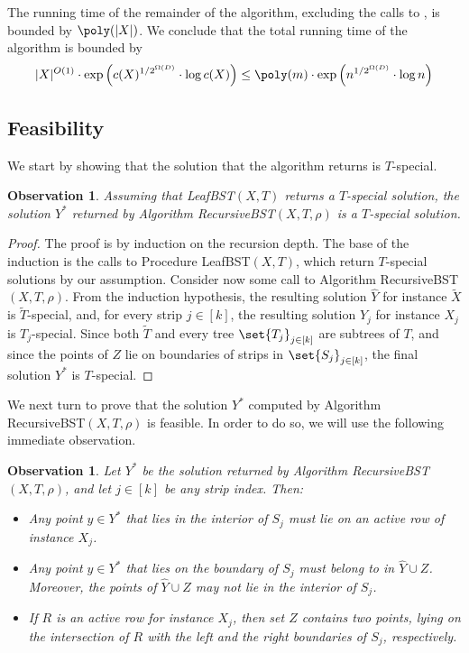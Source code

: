 \documentclass{toc}
\newtheorem{myobs}[theorem]{Observation}
\begin{document}
The running time of the remainder of the algorithm, excluding the calls to \leafBST, is bounded by $\poly(|X|)$. We conclude that the total running time of the algorithm is bounded by 
\[|X|^{O(1)}\cdot \exp\left({c(X)^{1/2^{\Omega(D)}}\cdot \log c(X)}\right )\leq \poly(m)\cdot \exp\left(n^{1/2^{\Omega(D)}}\cdot \log n \right )\] 


\subsection{Feasibility} 

We start by showing that the solution that the algorithm returns is $T$-special.

\begin{myobs}\label{obs: get special sol}
Assuming that {\sc LeafBST}$(X,T)$ returns a $T$-special solution, the solution $Y^*$ returned by Algorithm {\sc RecursiveBST}$(X,T,\rho)$ is  a $T$-special solution. 
\end{myobs}

\begin{proof}
    The proof is by induction on the recursion depth. The base of the induction is the calls to Procedure {\sc LeafBST}$(X,T)$, which return $T$-special solutions by our assumption.
Consider now some call to Algorithm {\sc RecursiveBST}$(X,T,\rho)$. From the induction hypothesis, the resulting solution $\hat{Y}$ for instance $\widetilde{X}$ is $\widetilde{T}$-special, and, for every strip $j \in [k]$, the resulting solution $Y_j$ for instance $X_j$ is $T_j$-special. 
Since both $\widetilde{T}$ and every tree $\set{T_j}_{j \in [k]}$ are subtrees of $T$, and since the points of $Z$ lie on boundaries of strips in $\set{S_j}_{j\in[k]}$, the final solution $Y^*$ is $T$-special. 
\end{proof}


%
%
%
%


We next turn to prove that the solution $Y^*$ computed by Algorithm {\sc RecursiveBST}$(X,T,\rho)$ is feasible. In order to do so, we will use the following immediate observation.



%
\begin{myobs}
	\label{obs:points structure} 
	Let $Y^*$ be the solution returned by Algorithm {\sc RecursiveBST}$(X,T,\rho)$, and let $j \in [k]$ be any strip index. Then:
	\begin{itemize}
		\item Any point $y\in Y^*$ that lies in the interior of $S_j$ must lie on an active row of instance $X_j$.
		\item Any point $y\in Y^*$ that lies on the boundary of $S_j$ must belong to in $\hat{Y}\cup Z$. Moreover, the points of $\hat{Y} \cup Z$ may not lie in the interior of $S_j$. 
\item If $R$ is an active row for instance $X_j$, then set $Z$ contains two points, lying on the intersection of $R$ with the left and the right boundaries of $S_j$, respectively.
		
%
	\end{itemize}
\end{myobs}
\end{document}
